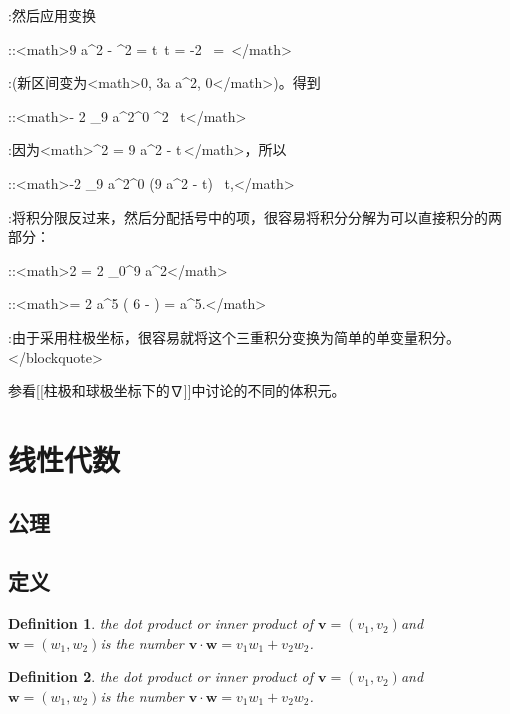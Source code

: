 \documentclass[UTF-8]{ctexart}
\newtheorem{definition}{Definition}[section]
\begin{document}
:然后应用变换

::<math>9 a^2 - \rho^2 = t\,\! \longrightarrow {}t = -2 \rho\, \rho \longrightarrow {}\rho = \,\!</math>

:(新区间变为<math>0, 3a  a^2, 0</math>)。得到

::<math>- 2 \pi \int_{9 a^2}^{0} \rho^2 \, t</math>

:因为<math>\rho^2 = 9 a^2 - t\,\!</math>，所以

::<math>-2 \pi \int_{9 a^2}^0 (9 a^2 - t) \, t,</math>

:将积分限反过来，然后分配括号中的项，很容易将积分分解为可以直接积分的两部分：

::<math>2 \pi {} = 2 \pi {}_0^{9 a^2}</math>

::<math>= 2  \pi a^5 \left ( 6 -  \right ) =  a^5.</math>

:由于采用柱极坐标，很容易就将这个三重积分变换为简单的单变量积分。</blockquote>

参看[[柱极和球极坐标下的∇]]中讨论的不同的体积元。


\section{线性代数}

\subsection{公理}
\subsection{定义}
\begin{definition}
  the dot product or inner product of $\mathbf{v}
=(v_1,v_2)$and$\mathbf{w}=(w_1,w_2)$is the number $\mathbf{v} \cdot \mathbf{w} = v_1w_1+v_2w_2$.

\end{definition}
\begin{definition}
  the dot product or inner product of $\mathbf{v}
=(v_1,v_2)$and$\mathbf{w}=(w_1,w_2)$is the number $\mathbf{v} \cdot \mathbf{w} = v_1w_1+v_2w_2$.

\end{definition}
\end{document}
